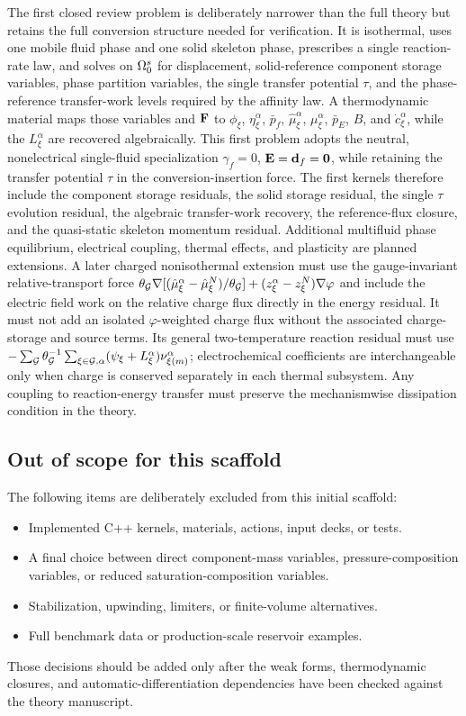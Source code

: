 The first closed review problem is deliberately narrower than the full theory
but retains the full conversion structure needed for verification.  It is
isothermal, uses one mobile fluid phase and one solid skeleton phase, prescribes
a single reaction-rate law, and solves on \(\Omega_0^s\) for displacement,
solid-reference component storage variables, phase partition variables, the
single transfer potential \(\tau\), and the phase-reference transfer-work
levels required by the affinity law.  A thermodynamic material
maps those variables and \(\mathbf{F}\) to
\(\phi_\xi\), \(\eta_\xi^\alpha\), \(\bar p_f\),
\(\hat\mu_\xi^\alpha\), \(\mu_\xi^\alpha\), \(\bar p_E\), \(B\), and
\(\dot c_\xi^\alpha\), while the \(L_\xi^\alpha\) are recovered
algebraically.  This first problem adopts the
neutral, nonelectrical single-fluid specialization
\(\gamma_f=0\), \(\mathbf{E}=\mathbf{d}_f=\mathbf{0}\), while retaining the transfer
potential \(\tau\) in the conversion-insertion force.  The first kernels
therefore include the component storage residuals, the solid storage residual,
the single \(\tau\) evolution residual, the algebraic transfer-work recovery,
the reference-flux closure, and the quasi-static skeleton momentum residual.
Additional multifluid phase
equilibrium, electrical coupling, thermal effects, and plasticity are planned
extensions.  A later charged nonisothermal extension must use the
gauge-invariant relative-transport force
\(\theta_{\mathcal{G}}\nabla[(\hat\mu_\xi^\alpha-\hat\mu_\xi^N)/\theta_{\mathcal{G}}]
+(z_\xi^\alpha-z_\xi^N)\nabla\varphi\) and include the electric
field work on the relative charge flux directly in the energy residual.  It
must not add an isolated \(\varphi\)-weighted charge flux without the associated
charge-storage and source terms.  Its general two-temperature reaction residual
must use
\(-\sum_{\mathcal{G}}\theta_{\mathcal{G}}^{-1}
\sum_{\xi\in\mathcal{G},\alpha}(\psi_\xi+L_\xi^\alpha)\nu_{\xi(m)}^\alpha\);
electrochemical coefficients are interchangeable only when charge is conserved
separately in each thermal subsystem.  Any coupling to reaction-energy transfer
must preserve the mechanismwise dissipation condition in the theory.

\subsection{Out of scope for this scaffold}
\label{sec:out_of_scope}

The following items are deliberately excluded from this initial scaffold:
\begin{itemize}[leftmargin=*]
	\item Implemented C++ kernels, materials, actions, input decks, or tests.
	\item A final choice between direct component-mass variables, pressure-composition variables, or reduced saturation-composition variables.
	\item Stabilization, upwinding, limiters, or finite-volume alternatives.
	\item Full benchmark data or production-scale reservoir examples.
\end{itemize}

Those decisions should be added only after the weak forms, thermodynamic
closures, and automatic-differentiation dependencies have been checked against
the theory manuscript.
